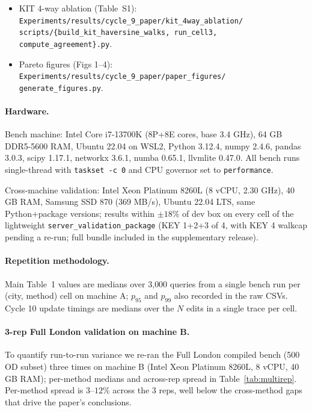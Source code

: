 \documentclass[letterpaper]{article}
\begin{document}
\begin{itemize}
  CSV: \texttt{cycle10\_rebuild\_oracle/oracle\_results.csv} (3{,}600 per-query rows).
\item KIT 4-way ablation (Table~S1):\\
  \texttt{Experiments/results/cycle\_9\_paper/kit\_4way\_ablation/\\scripts/\{build\_kit\_haversine\_walks, run\_cell3, compute\_agreement\}.py}.
\item Pareto figures (Figs 1--4):\\
  \texttt{Experiments/results/cycle\_9\_paper/paper\_figures/\\generate\_figures.py}.
\end{itemize}

\paragraph{Hardware.}
Bench machine: Intel Core i7-13700K (8P+8E cores, base 3.4 GHz),
64 GB DDR5-5600 RAM, Ubuntu 22.04 on WSL2, Python 3.12.4,
numpy 2.4.6, pandas 3.0.3, scipy 1.17.1, networkx 3.6.1, numba 0.65.1,
llvmlite 0.47.0. All bench runs single-thread with
\texttt{taskset -c 0} and CPU governor set to \texttt{performance}.

Cross-machine validation: Intel Xeon Platinum 8260L (8 vCPU,
2.30 GHz), 40 GB RAM, Samsung SSD 870 (369 MB/s), Ubuntu 22.04 LTS,
same Python+package versions; results within $\pm 18\%$ of dev box on
every cell of the lightweight \texttt{server\_validation\_package}
(KEY 1+2+3 of 4, with KEY 4 walkcap pending a re-run; full bundle
included in the supplementary release).

\paragraph{Repetition methodology.}
Main Table~1 values are medians over 3{,}000 queries from a single
bench run per (city, method) cell on machine A; $p_{95}$ and $p_{99}$
also recorded in the raw CSVs. Cycle 10 update timings are medians
over the $N$ edits in a single trace per cell.

\paragraph{3-rep Full London validation on machine B.}
To quantify run-to-run variance we re-ran the Full London compiled
bench (500 OD subset) three times on machine B (Intel Xeon Platinum
8260L, 8 vCPU, 40 GB RAM); per-method medians and across-rep spread
in Table~\ref{tab:multirep}. Per-method spread is $3\text{--}12\%$
across the 3 reps, well below the cross-method gaps that drive the
paper's conclusions.
\end{document}

